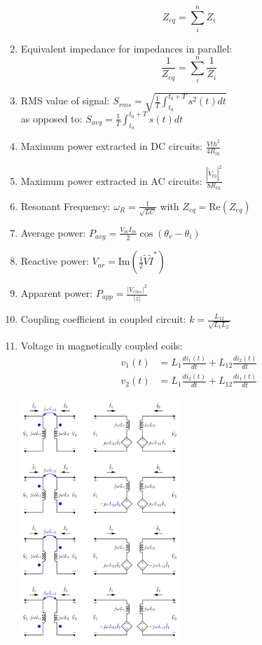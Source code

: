 \documentclass[twocolumn]{article}
\begin{document}
\begin{enumerate}
    \[Z_{eq} = \sum_{i}^{n} Z_i\]
    \item Equivalent impedance for impedances in parallel: 
    \[\frac{1}{Z_{eq}} = \sum_{i}^{n} \frac{1}{Z_i}\]
    \item RMS value of signal: $S_{rms} = \sqrt{\frac{1}{T}\int_{t_0}^{t_0+T} s^2(t) dt}$\\as opposed to: \hspace{1cm}$S_{avg}=\frac{1}{T}\int_{t_0}^{t_0+T} s(t) dt$
    \item Maximum power extracted in DC circuits: $\frac{V{th}^2}{4R_{th}}$
    \item Maximum power extracted in AC circuits: $\frac{|\tilde{V}_{th}|^2}{8R_{th}}$
    \item Resonant Frequency: $\omega_R = \frac{1}{\sqrt{LC}}$ with $Z_{eq}=\text{Re}(Z_{eq})$
    \item Average power: $P_{avg} = \frac{V_m I_m}{2}\cos{(\theta_v - \theta_i)}$
    \item Reactive power: $V_{ar} = \text{Im}(\frac{1}{2}\tilde{V}\tilde{I}^*)$
    \item Apparent power: $P_{app} = \frac{|V_{rms}|^2}{|z|}$
    \item Coupling coefficient in coupled circuit: $k = \frac{L_{12}}{\sqrt{L_1 L_2}}$
    \item Voltage in magnetically coupled coils: 
    \begin{align*}
        v_{1}(t) &= L_1 \frac{di_1(t)}{dt} + L_{12}\frac{di_2(t)}{dt} \\
        v_{2}(t) &= L_1 \frac{di_2(t)}{dt} + L_{12}\frac{di_1(t)}{dt} 
    \end{align*}
    \begin{center}
    \includegraphics[width=6cm]{images/transformer_transform.png}

\end{center}
\end{enumerate}
\end{document}
